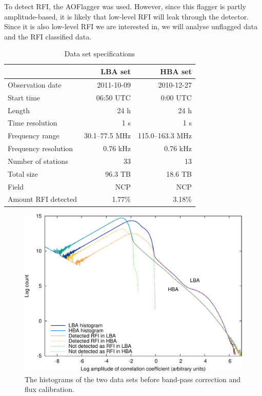 \documentclass[useAMS,usenatbib]{mn2e}
\begin{document}
To detect RFI, the AOFlagger \citep{LOFAR-RFI-pipeline, scale-invariant-rank-operator} was used. However, since this flagger is partly amplitude-based, it is likely that low-level RFI will leak through the detector. Since it is also low-level RFI we are interested in, we will analyse unflagged data and the RFI classified data.

\begin{table}
\caption{Data set specifications}\label{table:dist-data-specs}
\begin{center}
\begin{tabular}{lrr}
                    & \textbf{LBA set}& \textbf{HBA set} \\
\hline
\hline
Observation date    & 2011-10-09      & 2010-12-27 \\
Start time          & 06:50 UTC       & 0:00 UTC \\
Length              & 24 h           & 24 h \\
Time resolution     & 1 s             & 1 s \\
\hline
Frequency range     &  30.1--77.5 MHz & 115.0--163.3 MHz\\
Frequency resolution & 0.76 kHz    & 0.76 kHz \\
Number of stations  &  33           & 13 \\
Total size          & 96.3 TB        & 18.6 TB \\
\hline
Field               & NCP             & NCP \\
Amount RFI detected & 1.77\%       & 3.18\% \\
\hline
\hline
\end{tabular}
\end{center}
\end{table}

\begin{figure}
\begin{center}
\includegraphics[width=12cm]{img/histograms-raw-trimmed}
\caption{The histograms of the two data sets before band-pass correction and flux calibration.}
\label{fig:Histograms-raw}
\end{center}
\end{figure}
\end{document}
